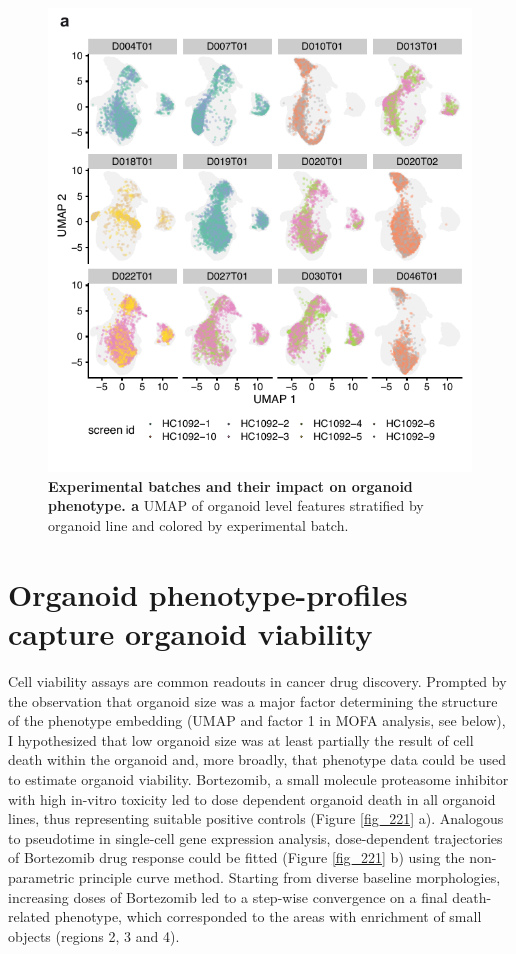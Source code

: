 \begin{flushleft}
\bigbreak

\begin{figure}[h]
\centering
\includegraphics[width=\textwidth,
                height=\textheight,
                keepaspectratio]{figures/promise/pdf/fig_1_6.pdf}
\caption[Experimental batches and their impact on organoid phenotype]{\textbf{Experimental batches and their impact on organoid phenotype. a} UMAP of organoid level features stratified by organoid line and colored by experimental batch.}
\label{fig_216}
\end{figure}
\clearpage


\section{Organoid phenotype-profiles capture organoid viability}

Cell viability assays are common readouts in cancer drug discovery. Prompted by the observation that organoid size was a major factor determining the structure of the phenotype embedding (UMAP and factor 1 in MOFA analysis, see below), I hypothesized that low organoid size was at least partially the result of cell death within the organoid and, more broadly, that phenotype data could be used to estimate organoid viability. Bortezomib, a small molecule proteasome inhibitor with high in-vitro toxicity led to dose dependent organoid death in all organoid lines, thus representing suitable positive controls (Figure \ref{fig_221} a). Analogous to pseudotime in single-cell  gene expression analysis, dose-dependent trajectories of Bortezomib drug response could be fitted (Figure \ref{fig_221} b) using the non-parametric principle curve method. Starting from diverse baseline morphologies, increasing doses of Bortezomib led to a step-wise convergence on a final death-related phenotype, which corresponded to the areas with enrichment of small objects (regions 2, 3 and 4). 


\end{flushleft}
